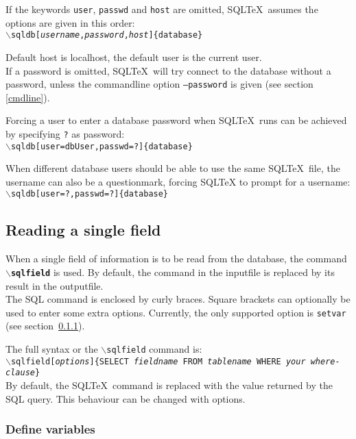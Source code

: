 \documentclass{article}
\newcommand{\bs}{\ensuremath{\backslash}}
\newcommand{\vs}{\vspace{3mm}}
\begin{document}
\vs

If the keywords \texttt{user}, \texttt{passwd} and \texttt{host} are omitted, SQL\TeX\ assumes the options are given in
this order:\\
\texttt{\bs sqldb[\textit{username},\textit{password},\textit{host}]\{database\}}


Default host is localhost, the default user is the current user.\\
If a password is omitted, SQL\TeX\ will try connect to the database without a password, unless the commandline option \texttt{--password} is given (see section \ref{cmdline}).

\vs

Forcing a user to enter a database password when SQL\TeX\ runs can be achieved by specifying \texttt{?} as password:\\
\texttt{\bs sqldb[user=dbUser,passwd=?]\{database\}}

\vs

When different database users should be able to use the same SQL\TeX\ file, the username can also be a questionmark, forcing SQL\TeX
to prompt for a username:\\
\texttt{\bs sqldb[user=?,passwd=?]\{database\}}

\subsection{Reading a single field}\label{sqlfield}

When a single field of information is to be read from the database, the command \texttt{\textbf{\bs sqlfield}}
is used. By default, the command in the inputfile is replaced by its result in the outputfile.\\
The SQL command is enclosed by curly braces. Square brackets can optionally be used to enter some extra options.
Currently, the only supported option is \texttt{setvar} (see section~\ref{vars}).

The full syntax or the \texttt{\bs sqlfield} command is:\\
\texttt{\bs sqlfield[\textit{options}]\{SELECT \textit{fieldname} FROM \textit{tablename} WHERE \textit{your where-clause}\}} \\
By default, the SQL\TeX\ command is replaced with the value returned by the SQL query. This behaviour
can be changed with options.


\subsubsection{Define variables}\label{vars}
\end{document}
